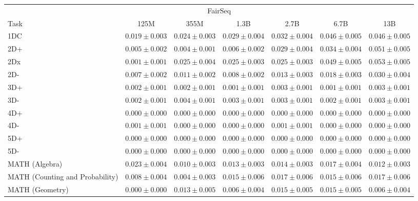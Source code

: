 \documentclass[11pt]{article}
\begin{document}
{\begin{landscape}
\begin{table}
\centering %
\begin{tabular}{l c c c c c c } \\ 
& \multicolumn{4}{c}{FairSeq} \\ 
Task & 125M & 355M & 1.3B & 2.7B & 6.7B & 13B \\ \toprule
1DC & $0.019 \pm 0.003$ & $0.024 \pm 0.003$ & $0.029 \pm 0.004$ & $0.032 \pm 0.004$ & $0.046 \pm 0.005$ & $0.046 \pm 0.005$ \\ 
2D+ & $0.005 \pm 0.002$ & $0.004 \pm 0.001$ & $0.006 \pm 0.002$ & $0.029 \pm 0.004$ & $0.034 \pm 0.004$ & $0.051 \pm 0.005$ \\ 
2Dx & $0.001 \pm 0.001$ & $0.025 \pm 0.004$ & $0.025 \pm 0.003$ & $0.025 \pm 0.003$ & $0.049 \pm 0.005$ & $0.053 \pm 0.005$ \\ 
2D- & $0.007 \pm 0.002$ & $0.011 \pm 0.002$ & $0.008 \pm 0.002$ & $0.013 \pm 0.003$ & $0.018 \pm 0.003$ & $0.030 \pm 0.004$ \\ 
3D+ & $0.002 \pm 0.001$ & $0.002 \pm 0.001$ & $0.001 \pm 0.001$ & $0.003 \pm 0.001$ & $0.001 \pm 0.001$ & $0.003 \pm 0.001$ \\ 
3D- & $0.002 \pm 0.001$ & $0.004 \pm 0.001$ & $0.003 \pm 0.001$ & $0.003 \pm 0.001$ & $0.002 \pm 0.001$ & $0.003 \pm 0.001$ \\ 
4D+ & $0.000 \pm 0.000$ & $0.000 \pm 0.000$ & $0.000 \pm 0.000$ & $0.000 \pm 0.000$ & $0.000 \pm 0.000$ & $0.000 \pm 0.000$ \\ 
4D- & $0.001 \pm 0.001$ & $0.000 \pm 0.000$ & $0.000 \pm 0.000$ & $0.001 \pm 0.001$ & $0.000 \pm 0.000$ & $0.000 \pm 0.000$ \\ 
5D+ & $0.000 \pm 0.000$ & $0.000 \pm 0.000$ & $0.000 \pm 0.000$ & $0.000 \pm 0.000$ & $0.000 \pm 0.000$ & $0.000 \pm 0.000$ \\ 
5D- & $0.000 \pm 0.000$ & $0.000 \pm 0.000$ & $0.000 \pm 0.000$ & $0.000 \pm 0.000$ & $0.000 \pm 0.000$ & $0.000 \pm 0.000$ \\ 
MATH (Algebra) & $0.023 \pm 0.004$ & $0.010 \pm 0.003$ & $0.013 \pm 0.003$ & $0.014 \pm 0.003$ & $0.017 \pm 0.004$ & $0.012 \pm 0.003$ \\ 
MATH (Counting and Probability) & $0.008 \pm 0.004$ & $0.004 \pm 0.003$ & $0.015 \pm 0.006$ & $0.017 \pm 0.006$ & $0.015 \pm 0.006$ & $0.017 \pm 0.006$ \\ 
MATH (Geometry) & $0.000 \pm 0.000$ & $0.013 \pm 0.005$ & $0.006 \pm 0.004$ & $0.015 \pm 0.005$ & $0.015 \pm 0.005$ & $0.006 \pm 0.004$ \\ 

\end{tabular}
\end{table}
\end{landscape}}
\end{document}
